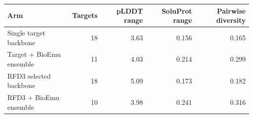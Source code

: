 \begin{tabular}{lrrrr}
\toprule
Arm & Targets & pLDDT range & SoluProt range & Pairwise diversity \\
\midrule
Single target backbone & 18 & 3.63 & 0.156 & 0.165 \\
Target + BioEmu ensemble & 11 & 4.03 & 0.214 & 0.299 \\
RFD3 selected backbone & 18 & 5.09 & 0.173 & 0.182 \\
RFD3 + BioEmu ensemble & 10 & 3.98 & 0.241 & 0.316 \\
\bottomrule
\end{tabular}
